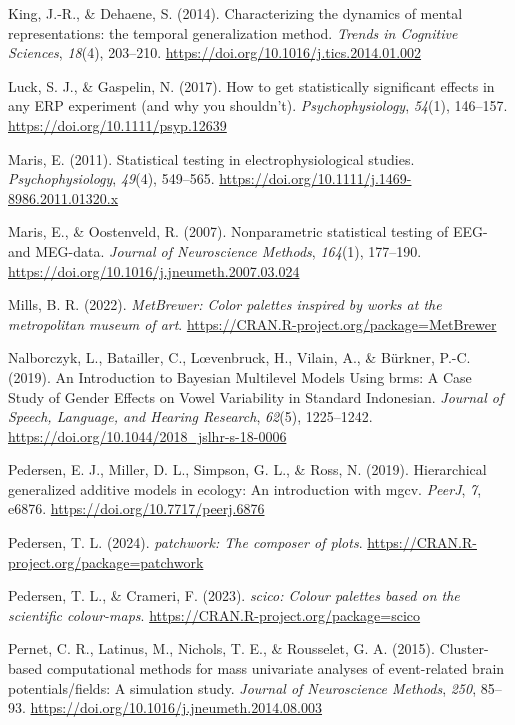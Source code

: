 \documentclass[
  doc,
  floatsintext,
  longtable,
  a4paper,
  nolmodern,
  notxfonts,
  notimes,
  colorlinks=true,linkcolor=blue,citecolor=blue,urlcolor=blue]{apa7}
\newlength{\cslhangindent}
\newenvironment{CSLReferences}[2] %
 {\begin{list}{}{%
  \setlength{\itemindent}{0pt}
  \setlength{\leftmargin}{0pt}
  \setlength{\parsep}{0pt}
  \ifodd #1
   \setlength{\leftmargin}{\cslhangindent}
   \setlength{\itemindent}{-1\cslhangindent}
  \fi
  \setlength{\itemsep}{#2\baselineskip}}}
 {\end{list}}
\begin{document}
\begin{CSLReferences}{1}{0}
King, J.-R., \& Dehaene, S. (2014). Characterizing the dynamics of
mental representations: the temporal generalization method. \emph{Trends
in Cognitive Sciences}, \emph{18}(4), 203--210.
\url{https://doi.org/10.1016/j.tics.2014.01.002}

Luck, S. J., \& Gaspelin, N. (2017). How to get statistically
significant effects in any {ERP} experiment (and why you shouldn't).
\emph{Psychophysiology}, \emph{54}(1), 146--157.
\url{https://doi.org/10.1111/psyp.12639}

Maris, E. (2011). Statistical testing in electrophysiological studies.
\emph{Psychophysiology}, \emph{49}(4), 549--565.
\url{https://doi.org/10.1111/j.1469-8986.2011.01320.x}

Maris, E., \& Oostenveld, R. (2007). Nonparametric statistical testing
of EEG- and MEG-data. \emph{Journal of Neuroscience Methods},
\emph{164}(1), 177--190.
\url{https://doi.org/10.1016/j.jneumeth.2007.03.024}

Mills, B. R. (2022). \emph{{MetBrewer}: Color palettes inspired by works
at the metropolitan museum of art}.
\url{https://CRAN.R-project.org/package=MetBrewer}

Nalborczyk, L., Batailler, C., Lœvenbruck, H., Vilain, A., \& Bürkner,
P.-C. (2019). An Introduction to Bayesian Multilevel Models Using brms:
A Case Study of Gender Effects on Vowel Variability in Standard
Indonesian. \emph{Journal of Speech, Language, and Hearing Research},
\emph{62}(5), 1225--1242.
\url{https://doi.org/10.1044/2018_jslhr-s-18-0006}

Pedersen, E. J., Miller, D. L., Simpson, G. L., \& Ross, N. (2019).
Hierarchical generalized additive models in ecology: An introduction
with mgcv. \emph{PeerJ}, \emph{7}, e6876.
\url{https://doi.org/10.7717/peerj.6876}

Pedersen, T. L. (2024). \emph{{patchwork}: The composer of plots}.
\url{https://CRAN.R-project.org/package=patchwork}

Pedersen, T. L., \& Crameri, F. (2023). \emph{{scico}: Colour palettes
based on the scientific colour-maps}.
\url{https://CRAN.R-project.org/package=scico}

Pernet, C. R., Latinus, M., Nichols, T. E., \& Rousselet, G. A. (2015).
Cluster-based computational methods for mass univariate analyses of
event-related brain potentials/fields: A simulation study. \emph{Journal
of Neuroscience Methods}, \emph{250}, 85--93.
\url{https://doi.org/10.1016/j.jneumeth.2014.08.003}


\end{CSLReferences}
\end{document}
